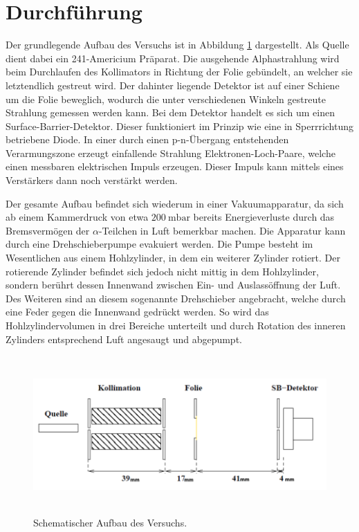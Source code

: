 \section{Durchführung}
\label{sec:Durchführung}

Der grundlegende Aufbau des Versuchs ist in Abbildung \ref{fig:aufbau} dargestellt.
Als Quelle dient dabei ein 241-Americium Präparat. Die ausgehende Alphastrahlung
wird beim Durchlaufen des Kollimators in Richtung der Folie gebündelt, an welcher
sie letztendlich gestreut wird. Der dahinter liegende Detektor ist auf einer Schiene
um die Folie beweglich, wodurch die unter verschiedenen Winkeln gestreute Strahlung
gemessen werden kann. Bei dem Detektor handelt es sich um einen Surface-Barrier-Detektor.
Dieser funktioniert im Prinzip wie eine in Sperrrichtung betriebene Diode. In einer durch einen p-n-Übergang
entstehenden Verarmungszone erzeugt einfallende Strahlung Elektronen-Loch-Paare,
welche einen messbaren elektrischen Impuls erzeugen. Dieser Impuls kann mittels eines
Verstärkers dann noch verstärkt werden.

Der gesamte Aufbau befindet sich wiederum in einer Vakuumapparatur, da sich ab einem
Kammerdruck von etwa $\SI{200}{\milli\bar}$ bereits Energieverluste durch das Bremsvermögen
der $\alpha$-Teilchen in Luft bemerkbar machen. 
Die Apparatur kann durch eine Drehschieberpumpe evakuiert werden. Die Pumpe besteht im Wesentlichen
aus einem Hohlzylinder, in dem ein weiterer Zylinder rotiert. Der rotierende Zylinder
befindet sich jedoch nicht mittig in dem Hohlzylinder, sondern berührt dessen Innenwand
zwischen Ein- und Auslassöffnung der Luft. Des Weiteren sind an diesem sogenannte
Drehschieber angebracht, welche durch eine Feder gegen die Innenwand gedrückt werden.
So wird das Hohlzylindervolumen in drei Bereiche unterteilt und durch Rotation des
inneren Zylinders entsprechend Luft angesaugt und abgepumpt.

\begin{figure}[H]
  \centering
  \includegraphics[height=6cm]{Aufbau.PNG}
  \caption{Schematischer Aufbau des Versuchs. \cite{sample1}}
  \label{fig:aufbau}
\end{figure}

